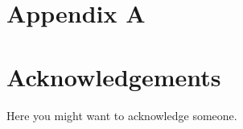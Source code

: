 \documentclass{Configuration_Files/PoliMi3i_thesis}
\theoremstyle{colored}
\theoremstyle{colored}
\begin{document}
    \chapter{Appendix A}
    
    
    
    


    \listoffigures

    \listoftables


    \chapter*{Acknowledgements}
    Here you might want to acknowledge someone.

    \cleardoublepage
\end{document}
